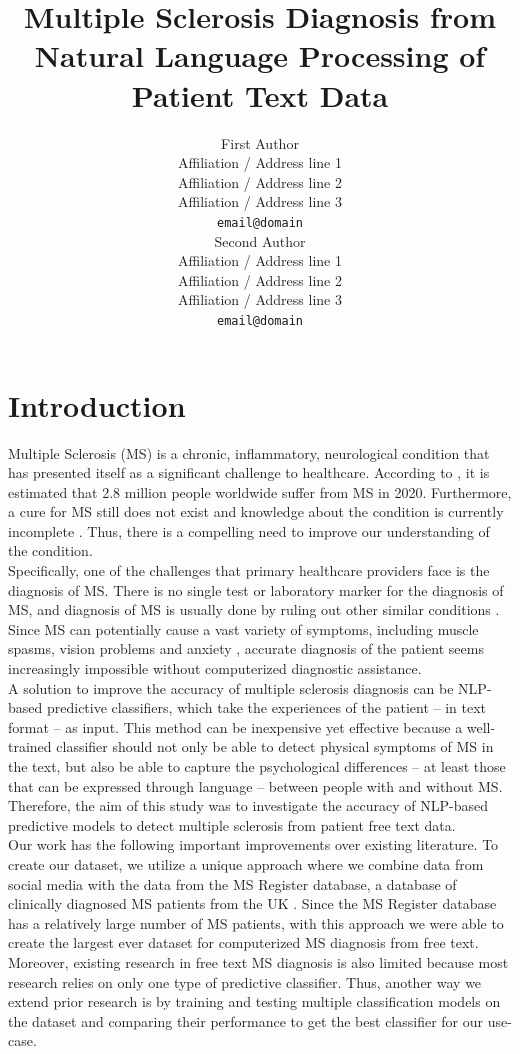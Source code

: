 \documentclass[11pt,a4paper]{article}
\title{Multiple Sclerosis Diagnosis from Natural Language Processing of Patient Text Data}
\author{First Author \\
  Affiliation / Address line 1 \\
  Affiliation / Address line 2 \\
  Affiliation / Address line 3 \\
  \texttt{email@domain} \\\And
  Second Author \\
  Affiliation / Address line 1 \\
  Affiliation / Address line 2 \\
  Affiliation / Address line 3 \\
  \texttt{email@domain} \\}
\date{}
\begin{document}
\maketitle
\begin{abstract}
\end{abstract}

\section{Introduction}
Multiple Sclerosis (MS) is a chronic, inflammatory, neurological condition that has presented itself as a significant challenge to healthcare. According to \citet{Walton:20}, it is estimated that 2.8 million people worldwide suffer from MS in 2020. Furthermore, a cure for MS still does not exist and knowledge about the condition is currently incomplete \citep{Bebo:22}. Thus, there is a compelling need to improve our understanding of the condition. \\
\indent Specifically, one of the challenges that primary healthcare providers face is the diagnosis of MS. There is no single test or laboratory marker for the diagnosis of MS, and diagnosis of MS is usually done by ruling out other similar conditions \citep{Omerhoca:18}. Since MS can potentially cause a vast variety of symptoms, including muscle spasms, vision problems and anxiety \citep{Ghasemi:17}, accurate diagnosis of the patient seems increasingly impossible without computerized diagnostic assistance. \\
\indent A solution to improve the accuracy of multiple sclerosis diagnosis can be NLP-based predictive classifiers, which take the experiences of the patient – in text format – as input. This method can be inexpensive yet effective because a well-trained classifier should not only be able to detect physical symptoms of MS in the text, but also be able to capture the psychological differences – at least those that can be expressed through language – between people with and without MS. Therefore, the aim of this study was to investigate the accuracy of NLP-based predictive models to detect multiple sclerosis from patient free text data. \\
\indent Our work has the following important improvements over existing literature. To create our dataset, we utilize a unique approach where we combine data from social media with the data from the MS Register database, a database of clinically diagnosed MS patients from the UK \citep{Ford:12}. Since the MS Register database has a relatively large number of MS patients, with this approach we were able to create the largest ever dataset for computerized MS diagnosis from free text. Moreover, existing research in free text MS diagnosis is also limited because most research relies on only one type of predictive classifier. Thus, another way we extend prior research is by training and testing multiple classification models on the dataset and comparing their performance to get the best classifier for our use-case. \\
\end{document}
